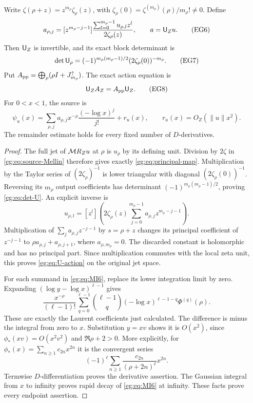 \begin{egproposition}\label{eg:prop:principal}
Write $\zeta(\rho+z)=z^{m_\rho}\zeta_\rho(z)$, with
$\zeta_\rho(0)=\zeta^{(m_\rho)}(\rho)/m_\rho!\ne0$. Define
\[
 a_{\rho,j}=[z^{m_\rho-j-1}]
 \frac{\sum_{l=0}^{m_\rho-1}u_{\rho,l}z^l}{2\zeta_\rho(z)},
 \qquad a=\mathsf U_Zu.\tag{EG6}\label{eg:eq:principal-map}
\]
Then $\mathsf U_Z$ is invertible, and its exact block determinant is
\[
 \det\mathsf U_\rho=(-1)^{m_\rho(m_\rho-1)/2}
                         (2\zeta_\rho(0))^{-m_\rho}.
 \tag{EG7}\label{eg:eq:det-U}
\]
Put $A_{\rm pp}=\bigoplus_\rho(\rho I+J^\uparrow_{m_\rho})$.
The exact action equation is
\[
 \mathsf U_ZA_Z=A_{\rm pp}\mathsf U_Z.\tag{EG8}\label{eg:eq:U-action}
\]
For $0<x<1$, the source is
\[
 \psi_u(x)=\sum_{\rho,j}a_{\rho,j}
                   x^{-\rho}\frac{(-\log x)^j}{j!}+r_u(x),
 \qquad r_u(x)=O_Z(\|u\|x^2).
 \tag{EG9}\label{eg:eq:source-singular}
\]
The remainder estimate holds for every fixed number of $D$-derivatives.
\end{egproposition}
\begin{proof}
The full jet of $\mathcal M R_Zu$ at $\rho$ is $u_\rho$ by its defining
unit. Division by $2\zeta$ in \eqref{eg:eq:source-Mellin} therefore gives
exactly \eqref{eg:eq:principal-map}. Multiplication by the Taylor series
of $(2\zeta_\rho)^{-1}$ is lower triangular with diagonal
$(2\zeta_\rho(0))^{-1}$. Reversing its $m_\rho$ output coefficients
has determinant $(-1)^{m_\rho(m_\rho-1)/2}$, proving \eqref{eg:eq:det-U}.
An explicit inverse is
\[
 u_{\rho,l}=[z^l]\left(2\zeta_\rho(z)
                     \sum_{j=0}^{m_\rho-1}a_{\rho,j}z^{m_\rho-j-1}\right).
\]
Multiplication of $\sum_j a_{\rho,j}z^{-j-1}$ by $s=\rho+z$
changes its principal coefficient of $z^{-j-1}$ to
$\rho a_{\rho,j}+a_{\rho,j+1}$, where $a_{\rho,m_\rho}=0$.
The discarded constant is holomorphic and has no principal part.
Since multiplication commutes with the local zeta unit, this proves
\eqref{eg:eq:U-action} on the original jet space.

For each summand in \eqref{eg:eq:MI6}, replace its lower integration
limit by zero. Expanding $(\log y-\log x)^{\ell-1}$ gives
\[
 \frac{x^{-\rho}}{(\ell-1)!}
 \sum_{q=0}^{\ell-1}\binom{\ell-1}{q}
 (-\log x)^{\ell-1-q}\Phi^{(q)}(\rho).
\]
These are exactly the Laurent coefficients just calculated. The
difference is minus the integral from zero to $x$. Substitution
$y=xv$ shows it is $O(x^2)$, since $\phi_*(xv)=O(x^2v^2)$ and
$\Re\rho+2>0$. More explicitly, for
$\phi_*(x)=\sum_{n\ge1}c_{2n}x^{2n}$ it is the convergent series
\[
 (-1)^\ell\sum_{n\ge1}\frac{c_{2n}}{(\rho+2n)^\ell}x^{2n}.
\]
Termwise $D$-differentiation proves the derivative assertion. The
Gaussian integral from $x$ to infinity proves rapid decay of
\eqref{eg:eq:MI6} at infinity. These facts prove every endpoint assertion.
\end{proof}

